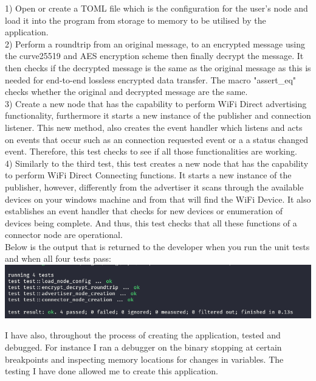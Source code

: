 \documentclass[a4paper, titlepage]{article}
\begin{document}
1) Open or create a TOML file which is the configuration for the user's node and load it into the program from storage to memory to be utilised by the application. \\

2) Perform a roundtrip from an original message, to an encrypted message using the curve25519 and AES encryption scheme then finally decrypt the message. It then checks if the decrypted message is the same as the original message as this is needed for end-to-end lossless encrypted data transfer. The macro "assert\_eq" checks whether the original and decrypted message are the same.\\

3) Create a new node that has the capability to perform WiFi Direct advertising functionality, furthermore it starts a new instance of the publisher and connection listener. This new method, also creates the event handler which listens and acts on events that occur such as an connection requested event or a a status changed event. Therefore, this test checks to see if all those functionalities are working.\\

4) Similarly to the third test, this test creates a new node that has the capability to perform WiFi Direct Connecting functions. It starts a new instance of the publisher, however, differently from the advertiser it scans through the available devices on your windows machine and from that will find the WiFi Device. It also establishes an event handler that checks for new devices or enumeration of devices being complete. And thus, this test checks that all these functions of a connector node are operational.\\

Below is the output that is returned to the developer when you run the unit tests and when all four tests pass: \\

\includegraphics[width=1\textwidth]{tests_running.png}\par

I have also, throughout the process of creating the application, tested and debugged. For instance I ran a debugger on the binary stopping at certain breakpoints and inspecting memory locations for changes in variables. The testing I have done allowed me to create this application.
\end{document}
